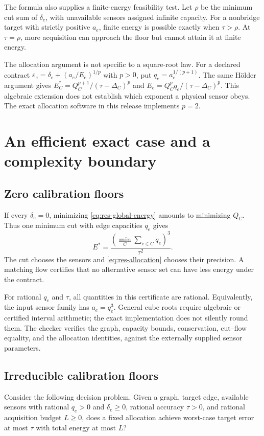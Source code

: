 The formula also supplies a finite-energy feasibility test. Let $\rho$ be the
minimum cut sum of $\delta_e$, with unavailable sensors assigned infinite
capacity. For a nonbridge target with strictly positive $a_e$, finite energy
is possible exactly when $\tau>\rho$. At $\tau=\rho$, more acquisition can
approach the floor but cannot attain it at finite energy.

\begin{remark}
The allocation argument is not specific to a square-root law. For a declared
contract $\varepsilon_e=\delta_e+(a_e/E_e)^{1/p}$ with $p>0$, put
$q_e=a_e^{1/(p+1)}$. The same H\"older argument gives
$E_C^*=Q_C^{p+1}/(\tau-\Delta_C)^p$ and
$E_e=Q_C^p q_e/(\tau-\Delta_C)^p$.
This algebraic extension does not establish which exponent a physical sensor
obeys. The exact allocation software in this release implements $p=2$.
\end{remark}

\section{An efficient exact case and a complexity boundary}

\subsection{Zero calibration floors}
If every $\delta_e=0$, minimizing \eqref{eq:res-global-energy} amounts to
minimizing $Q_C$. Thus one minimum cut with edge capacities $q_e$ gives
\begin{equation}
 E^*=\frac{\left(\min_C\sum_{e\in C}q_e\right)^3}{\tau^2}.
 \label{eq:res-ideal-energy}
\end{equation}
The cut chooses the sensors and \eqref{eq:res-allocation} chooses their
precision. A matching flow certifies that no alternative sensor set can have
less energy under the contract.

For rational $q_e$ and $\tau$, all quantities in this certificate are rational.
Equivalently, the input sensor family has $a_e=q_e^3$. General cube roots require
algebraic or certified interval arithmetic; the exact implementation does not
silently round them. The checker verifies the graph, capacity bounds,
conservation, cut--flow equality, and the allocation identities, against the
externally supplied sensor parameters.

\subsection{Irreducible calibration floors}
Consider the following decision problem. Given a graph, target edge, available
sensors with rational $q_e>0$ and $\delta_e\geq0$, rational accuracy $\tau>0$,
and rational acquisition budget $L\geq0$, does a fixed allocation achieve
worst-case target error at most $\tau$ with total energy at most $L$?

